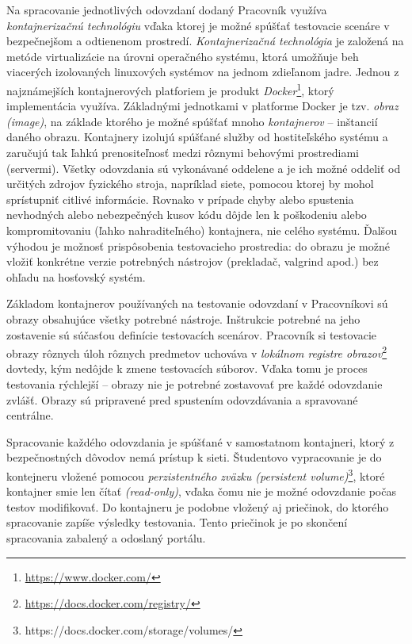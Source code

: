 \documentclass[
  digital, %
  twoside, %
  table,   %
  lof,     %
  lot,     %
]{fithesis3}
\begin{document}
Na spracovanie jednotlivých odovzdaní dodaný Pracovník využíva \emph{kontajnerizačnú technológiu} vďaka ktorej je možné spúšťať testovacie scenáre v bezpečnejšom a odtienenom prostredí. \emph{Kontajnerizačná technológia} je založená na metóde virtualizácie na úrovni operačného systému, ktorá umožňuje beh viacerých izolovaných linuxových systémov na jednom zdieľanom jadre\cite{linux-containers-rh}. Jednou z najznámejších kontajnerových platforiem je produkt \emph{Docker}\footnote{\url{https://www.docker.com/}}, ktorý implementácia využíva. Základnými jednotkami v platforme Docker je tzv. \emph{obraz (image)}\cite{docker-stuff}, na základe ktorého je možné spúšťať mnoho \emph{kontajnerov} -- inštancií daného obrazu. Kontajnery izolujú spúšťané služby od hostiteľského systému a zaručujú tak ľahkú prenositeľnosť medzi rôznymi behovými prostrediami (servermi)\cite{docker-stuff}. Všetky odovzdania sú vykonávané oddelene a je ich možné oddeliť od určitých zdrojov fyzického stroja, napríklad siete, pomocou ktorej by mohol sprístupniť citlivé informácie. Rovnako v prípade chyby alebo spustenia nevhodných alebo nebezpečných kusov kódu dôjde len k poškodeniu alebo kompromitovaniu (ľahko nahraditeľného) kontajnera, nie celého systému. Ďalšou výhodou je možnosť prispôsobenia testovacieho prostredia: do obrazu je možné vložiť konkrétne verzie potrebných nástrojov (prekladač, valgrind apod.) bez ohľadu na hosťovský systém.

Základom kontajnerov používaných na testovanie odovzdaní v Pracovníkovi sú obrazy obsahujúce všetky potrebné nástroje. Inštrukcie potrebné na jeho zostavenie sú súčasťou definície testovacích scenárov. Pracovník si testovacie obrazy rôznych úloh rôznych predmetov uchováva v \emph{lokálnom registre obrazov}\footnote{\url{https://docs.docker.com/registry/}} dovtedy, kým nedôjde k zmene testovacích súborov. Vďaka tomu je proces testovania rýchlejší -- obrazy nie je potrebné zostavovať pre každé odovzdanie zvlášť. Obrazy sú pripravené pred spustením odovzdávania a spravované centrálne.

Spracovanie každého odovzdania je spúšťané v samostatnom kontajneri, ktorý z bezpečnostných dôvodov nemá prístup k sieti. Študentovo vypracovanie je do kontejneru vložené pomocou \emph{perzistentného zväzku (persistent volume)}\footnote{https://docs.docker.com/storage/volumes/}, ktoré kontajner smie len čítať \emph{(read-only)}, vďaka čomu nie je možné odovzdanie počas testov modifikovať. Do kontajneru je podobne vložený aj priečinok, do ktorého spracovanie zapíše výsledky testovania. Tento priečinok je po skončení spracovania zabalený a odoslaný portálu.
\end{document}

